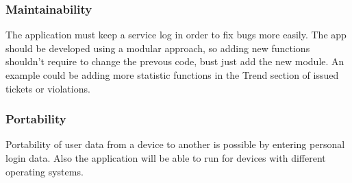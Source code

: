 \subsubsection{Maintainability}
The application must keep a service log in order to fix bugs more easily.
The app should be developed using a modular approach, so adding new functions shouldn't require to change the prevous code, bust just add the new module. An example could be adding more statistic functions in the Trend section of issued tickets or violations.

\subsubsection{Portability}
Portability of user data from a device to another is possible by entering personal login data. Also the application will be able to run for devices with different operating systems.

